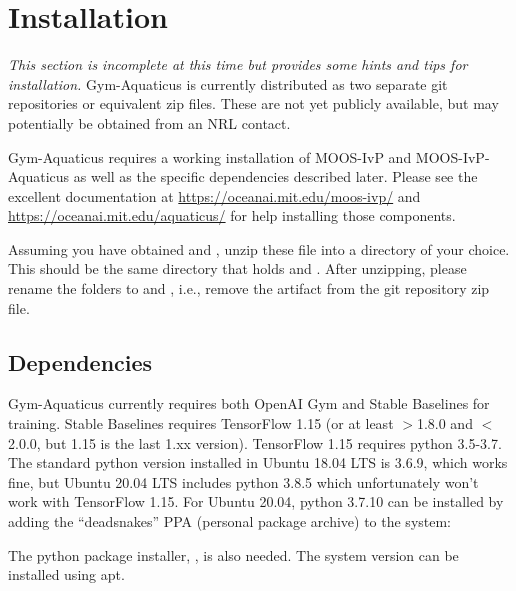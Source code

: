 \documentclass[onecolumn,letterpaper,11pt]{article}
\begin{document}
\section{Installation}

\emph{This section is incomplete at this time but provides some hints
and tips for installation.}  Gym-Aquaticus is currently distributed as
two separate git repositories or equivalent zip files. These are not
yet publicly available, but may potentially be obtained from an NRL
contact.

Gym-Aquaticus requires a working installation of MOOS-IvP and MOOS-IvP-Aquaticus
as well as the specific dependencies described later. Please see the
excellent documentation at \url{https://oceanai.mit.edu/moos-ivp/} and
\url{https://oceanai.mit.edu/aquaticus/} for help installing those components.

Assuming you have obtained  and
, unzip these file into a directory
of your choice. This should be the same directory that holds
 and . After unzipping, please
rename the folders to  and ,
i.e., remove the  artifact from the git repository zip
file.


\subsection{Dependencies}

Gym-Aquaticus currently requires both OpenAI Gym and Stable Baselines
for training.  Stable Baselines requires TensorFlow 1.15 (or at least
$>$1.8.0 and $<$2.0.0, but 1.15 is the last 1.xx version). TensorFlow
1.15 requires python 3.5-3.7. The standard python version installed in
Ubuntu 18.04 LTS is 3.6.9, which works fine, but Ubuntu 20.04 LTS
includes python 3.8.5 which unfortunately won't work with TensorFlow
1.15. For Ubuntu 20.04, python 3.7.10 can be installed by adding the
``deadsnakes'' PPA (personal package archive) to the system:

\vspace{11pt}

The python package installer, , is also needed. The
system version can be installed using apt.
\end{document}
